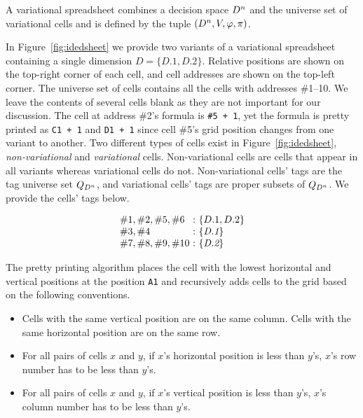 \documentclass[conference]{IEEEtran}
\def\OB#1{\ifmmode#1\else\mbox{$#1$}\fi}
\newcommand{\set}[1]{\ensuremath{\{#1\}}}
\newcommand{\prog}[1]{{\small\texttt{#1}}}
\newcommand{\dimset}[1][D]{\OB{#1^n}}
\newcommand{\decstr}{\OB{{\cal D}}}
\newcommand{\qt}[1][\decstr]{\OB{Q_{#1}}}
\newcommand{\mapname}[1]{\textit{#1}}
\newcommand{\dset}[1]{\{#1\}}
\newcommand{\gcell}[1]{\##1}
\newcommand{\pos}{\OB{\pi}}
\newcommand{\var}{\OB{V}}
\newcommand{\fml}{\OB{\varphi}}
\begin{document}
A variational spreadsheet combines a decision space $\dimset$ and the universe set of variational cells and is defined by the tuple $(\dimset, \var, \fml, \pos)$.

In Figure~\ref{fig:idedsheet} we provide two variants of a variational spreadsheet containing a single dimension $\mapname{D} = \set{D.1, D.2}$.
Relative positions are shown on the top-right corner of each cell, and cell addresses are shown on the top-left corner.
The universe set of cells contains all the cells with addresses \gcell{1--10}.
We leave the contents of several cells blank as they are not important for our discussion.
The cell at address \gcell{2}'s formula is \prog{\#5 + 1}, yet the formula is pretty printed as \prog{C1 + 1} and
\prog{D1 + 1} since cell \gcell{5}'s grid position changes from one variant to another. 
Two different types of cells exist in Figure~\ref{fig:idedsheet}, \emph{non-variational} and \emph{variational} cells.
Non-variational cells are cells that appear in all variants whereas variational cells do not. 
Non-variational cells' tags are the tag universe set $\qt[D^n]$, and variational cells' tags are proper subsets of $\qt[D^n]$.
We provide the cells' tags below.

\[
\begin{array}{l@{\ : \ }l}
    \gcell{1}, \gcell{2}, \gcell{5}, \gcell{6} & \set{D.1, D.2} \\
    \gcell{3}, \gcell{4} & \dset{\mapname{D.1}} \\
    \gcell{7}, \gcell{8}, \gcell{9}, \gcell{10} & \dset{\mapname{D.2}} \\
\end{array}
\]

The pretty printing algorithm places the cell with the lowest horizontal and vertical positions at the position \prog{A1} and recursively adds cells to the grid based on the following conventions.

\begin{itemize}
    \item Cells with the same vertical position are on the same column. Cells with the same horizontal position are on the same row.
    \item For all pairs of cells $x$ and $y$, if $x$'s horizontal position is less than $y$'s, $x$'s row number has to be less than $y$'s.
    \item For all pairs of cells $x$ and $y$, if $x$'s vertical position is less than $y$'s, $x$'s column number has to be less than $y$'s.
\end{itemize}
\end{document}
